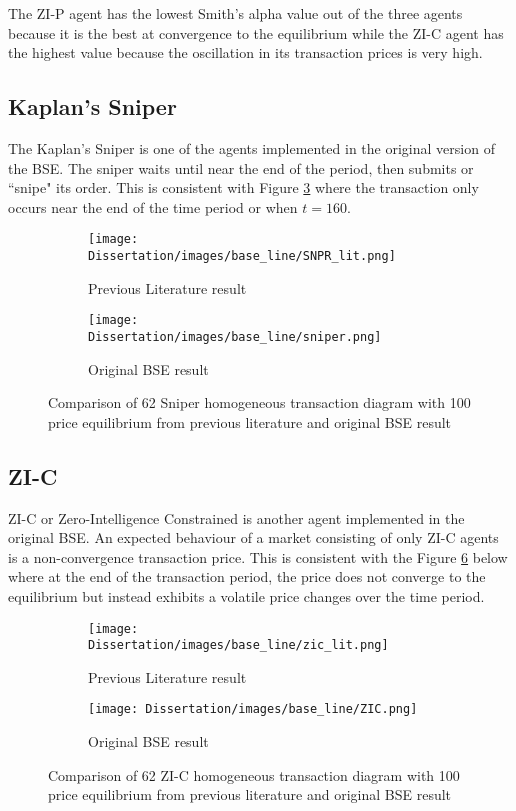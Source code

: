 The ZI-P agent has the lowest Smith's alpha value out of the three agents because it is the best at convergence to the equilibrium while the ZI-C agent has the highest value because the oscillation in its transaction prices is very high. 

\subsection{Kaplan's Sniper}
The Kaplan's Sniper is one of the agents implemented in the original version of the BSE. The sniper waits until near the end of the period, then submits or ``snipe" its order. This is consistent with Figure \ref{fig:Sniper_org_all} where the transaction only occurs near the end of the time period or when $t = 160$.

\begin{figure}[h]
  \begin{subfigure}[b]{0.5\textwidth}
    \texttt{[image: Dissertation/images/base\_line/SNPR\_lit.png]}
    \caption{Previous Literature result \cite{BSE_lit}} 
    \label{fig:Sniper_lit}
  \end{subfigure}
  \begin{subfigure}[b]{0.5\textwidth}
    \texttt{[image: Dissertation/images/base\_line/sniper.png]}
    \caption{Original BSE result}
    \label{fig:Sniper_original}
  \end{subfigure}
\caption{Comparison of 62 Sniper homogeneous transaction diagram with 100 price equilibrium from previous literature and original BSE result} 
\label{fig:Sniper_org_all}
\end{figure}
\FloatBarrier

\subsection{ZI-C}
ZI-C or Zero-Intelligence Constrained is another agent implemented in the original BSE. An expected behaviour of a market consisting of only ZI-C agents is a non-convergence transaction price. This is consistent with the Figure \ref{fig:ZIC_org_all} below where at the end of the transaction period, the price does not converge to the equilibrium but instead exhibits a volatile price changes over the time period. 

\begin{figure}[h]
  \begin{subfigure}[b]{0.5\textwidth}
    \texttt{[image: Dissertation/images/base\_line/zic\_lit.png]}
    \caption{Previous Literature result \cite{BSE_lit}} 
    \label{fig:1}
  \end{subfigure}
  \begin{subfigure}[b]{0.5\textwidth}
    \texttt{[image: Dissertation/images/base\_line/ZIC.png]}
    \caption{Original BSE result}
    \label{fig:2}
  \end{subfigure}
\caption{Comparison of 62 ZI-C homogeneous transaction diagram with 100 price equilibrium from previous literature and original BSE result} 
\label{fig:ZIC_org_all}
\end{figure}
\FloatBarrier


